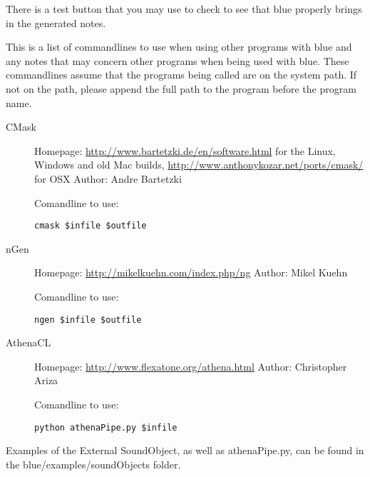 There is a test button that you may use to check to see that blue
properly brings in the generated notes.

This is a list of commandlines to use when using other programs with
blue and any notes that may concern other programs when being used with
blue. These commandlines assume that the programs being called are on
the system path. If not on the path, please append the full path to the
program before the program name.

\begin{description}
\item[CMask]
Homepage: \url{http://www.bartetzki.de/en/software.html} for the Linux,
Windows and old Mac builds,
\url{http://www.anthonykozar.net/ports/cmask/} for OSX Author: Andre
Bartetzki

Comandline to use:

\begin{verbatim}
cmask $infile $outfile
\end{verbatim}
\item[nGen]
Homepage: \url{http://mikelkuehn.com/index.php/ng} Author: Mikel Kuehn

Comandline to use:

\begin{verbatim}
ngen $infile $outfile
\end{verbatim}
\item[AthenaCL]
Homepage: \url{http://www.flexatone.org/athena.html} Author: Christopher
Ariza

Comandline to use:

\begin{verbatim}
python athenaPipe.py $infile
\end{verbatim}
\end{description}

Examples of the External SoundObject, as well as athenaPipe.py, can be
found in the blue/examples/soundObjects folder.
